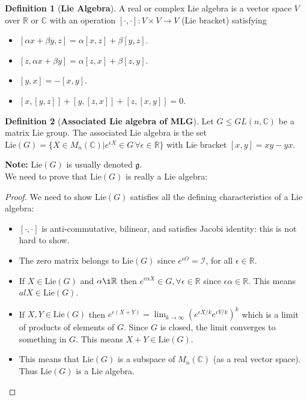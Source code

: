 \documentclass{book}
\theoremstyle{definition}
\newtheorem{defn}{Definition}[section]
\newcommand{\R}{\mathbb{R}}
\newcommand{\C}{\mathbb{C}}
\newcommand{\al}{\alpha}
\newcommand{\be}{\beta}
\newcommand{\ep}{\epsilon}
\newcommand{\lp}{\left(}
\newcommand{\rp}{\right)}
\newcommand{\Id}{\mathcal{I}}
\begin{document}
\begin{defn}[\textbf{Lie Algebra}]
	A real or complex Lie algebra is a vector space $V$ over $\R$ or $\C$ with an operation $[\cdot,\cdot]: V\times V \to V$ (Lie bracket) satisfying
	\begin{itemize}
		\item $[\al x + \be y, z] = \al[x,z] + \be[y,z]$.
		\item $[z,\al x + \be y] = \al[z,x] + \be[z,y]$.
		\item $[y,x] = -[x,y]$.
		\item $[x,[y,z]] + [y,[z,x]] + [z,[x,y]] = 0$.
	\end{itemize}
\end{defn}




\begin{defn}[\textbf{Associated Lie algebra of MLG}]
	Let $G \leq GL(n,\C)$ be a matrix Lie group. The associated Lie algebra is the set $\text{Lie}(G) = \{  X\in M_n(\C) \vert e^{\epsilon X} \in G \,\forall \epsilon \in \R   \}$ with Lie bracket $[x,y] = xy-yx$.
\end{defn}

\textbf{Note:} $\text{Lie}(G)$ is usually denoted $\mathfrak{g}$.\\

We need to prove that $\text{Lie}(G)$ is really a Lie algebra:
\begin{proof}
	We need to show Lie$(G)$ satisfies all the defining characteristics of a Lie algebra:
	\begin{itemize}
		\item $[\cdot,\cdot]$ is anti-commutative, bilinear, and satisfies Jacobi identity: this is not hard to show.
		
		\item The zero matrix belongs to Lie$(G)$ since $e^{\epsilon O} = \Id$, for all $\ep\in \R$. 
		
		\item If $X \in \text{Lie}(G)$ and $\al\i \R$ then $e^{\ep \al X} \in G,\forall \ep \in \R$ since $\ep\al \in \R$. This means $al X \in \text{Lie}(G)$.
		
		\item If $X,Y \in \text{Lie}(G)$ then $e^{\ep(X+Y)} = \lim_{k\to \infty}\lp e^{\ep X/k}e^{\ep Y/k} \rp^{k}$ which is a limit of products of elements of $G$. Since $G$ is closed, the limit converges to something in $G$. This means $X+Y\in \text{Lie}(G)$.
		
		\item This means that $\text{Lie}(G)$ is a subspace of $M_n(\C)$ (as a real vector space). Thus Lie$(G)$ is a Lie algebra. 
		
	\end{itemize}
\end{proof} 
\end{document}
